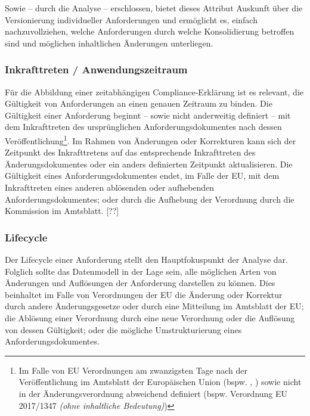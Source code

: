 Sowie -- durch die Analyse -- erschlossen, bietet dieses Attribut Auskunft über die Versionierung individueller Anforderungen und ermöglicht es, einfach nachzuvollziehen, welche Anforderungen durch welche Konsolidierung betroffen sind und möglichen inhaltlichen Änderungen unterliegen.


\subsubsection{Inkrafttreten / Anwendungszeitraum}

Für die Abbildung einer zeitabhängigen Compliance-Erklärung ist es relevant, die Gültigkeit von Anforderungen an einen genauen Zeitraum zu binden.
Die Gültigkeit einer Anforderung beginnt -- sowie nicht anderweitig definiert -- mit dem Inkrafttreten des ursprünglichen Anforderungsdokumentes nach dessen Veröffentlichung\footnote{Im Falle von EU Verordnungen am zwanzigsten Tage nach der Veröffentlichung im Amtsblatt der Europäischen Union (bspw. \cite[Art. 141]{2018R1139}, \cite[Art. 14]{2004R0549}) sowie nicht in der Änderungsverordnung abweichend definiert (bspw. Verordnung EU 2017/1347 \textit{(ohne inhaltliche Bedeutung)})}.
Im Rahmen von Änderungen oder Korrekturen kann sich der Zeitpunkt des Inkrafttretens auf das entsprechende Inkrafttreten des Änderungsdokumentes oder ein anders definierten Zeitpunkt  aktualisieren.\cite{eu_consolidation}
Die Gültigkeit eines Anforderungsdokumentes endet, im Falle der EU, mit dem Inkrafttreten eines anderen ablösenden oder aufhebenden Anforderungsdokumentes; oder durch die Aufhebung der Verordnung durch die Kommission im Amtsblatt. [??]

\pagebreak

\subsubsection{Lifecycle}

Der Lifecycle einer Anforderung stellt den Hauptfokuspunkt der Analyse dar. 
Folglich sollte das Datenmodell in der Lage sein, alle möglichen Arten von Änderungen und Auflösungen der Anforderung darstellen zu können.
Dies beinhaltet im Falle von Verordnungen der EU die Änderung oder Korrektur durch andere Änderungsgesetze oder durch eine Mitteilung im Amtsblatt der EU; die Ablösung einer Verordnung durch eine neue Verordnung oder die Auflösung von dessen Gültigkeit; oder die mögliche Umstrukturierung eines Anforderungsdokumentes.

